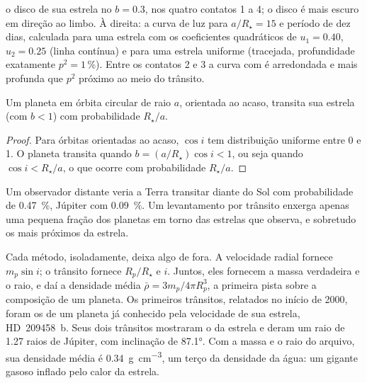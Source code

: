 \begin{omfigure}
{o disco de sua estrela no  $b = 0.3$, nos quatro
contatos 1 a 4; o disco é mais escuro em direção ao limbo. À direita: a curva
de luz para $a/R_\star = 15$ e período de dez dias, calculada para uma estrela
com os coeficientes quadráticos de  $u_1 = 0.40$, $u_2 = 0.25$
(linha contínua) e para uma estrela uniforme (tracejada, profundidade exatamente $p^2 = 1\,\%$).
Entre os contatos 2 e 3 a curva com  é arredondada e
mais profunda que $p^2$ próximo ao meio do trânsito.}\label{fig:b3:exoplanets:transit}
\end{omfigure}

\begin{proposition}\label{prop:b3:exoplanets:probability}
Um planeta em órbita circular de raio $a$, orientada ao acaso, transita
sua estrela (com $b < 1$) com probabilidade $R_\star/a$.
\end{proposition}

\begin{proof}
Para órbitas orientadas ao acaso, $\cos i$ tem distribuição uniforme entre
0 e 1. O planeta transita quando $b = (a/R_\star)\cos i < 1$, ou seja
quando $\cos i < R_\star/a$, o que ocorre com probabilidade $R_\star/a$.
\end{proof}

Um observador distante veria a Terra transitar diante do Sol com probabilidade
de \qty{0.47}{\percent}, Júpiter com \qty{0.09}{\percent}. Um levantamento por
trânsito enxerga apenas uma pequena fração dos planetas em torno das estrelas que
observa, e sobretudo os mais próximos da estrela.

Cada método, isoladamente, deixa algo de fora. A velocidade radial fornece
$m_p\sin i$; o trânsito fornece $R_p/R_\star$ e $i$. Juntos, eles fornecem
a massa verdadeira e o raio, e daí a densidade média
$\bar\rho = 3m_p/4\pi R_p^3$, a primeira pista sobre a composição de um planeta.
Os primeiros trânsitos, relatados no início de 2000, foram os de um planeta
já conhecido pela velocidade de sua estrela, HD~209458~b. Seus dois trânsitos
mostraram o  da estrela e deram um raio de 1.27 raios de Júpiter, com inclinação de
\ang{87.1}. Com a massa e o raio do arquivo, sua densidade média é
\qty{0.34}{g.cm^{-3}}, um terço da densidade da água: um gigante gasoso inflado pelo
calor da estrela.

